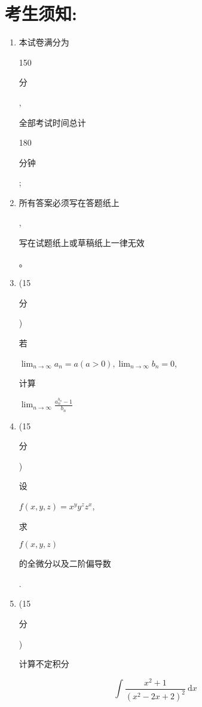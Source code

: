 \documentclass[10pt]{article}
\begin{document}
\section{考生须知:}
\begin{enumerate}
  \item \begin{CJK}{UTF8}{mj}本试卷满分为\end{CJK} 150 \begin{CJK}{UTF8}{mj}分\end{CJK}, \begin{CJK}{UTF8}{mj}全部考试时间总计\end{CJK} 180 \begin{CJK}{UTF8}{mj}分钟\end{CJK};

  \item \begin{CJK}{UTF8}{mj}所有答案必须写在答题纸上\end{CJK}, \begin{CJK}{UTF8}{mj}写在试题纸上或草稿纸上一律无效\end{CJK}。

  \item (15 \begin{CJK}{UTF8}{mj}分\end{CJK}) \begin{CJK}{UTF8}{mj}若\end{CJK} $\lim _{n \rightarrow \infty} a_{n}=a(a>0), \lim _{n \rightarrow \infty} b_{n}=0$, \begin{CJK}{UTF8}{mj}计算\end{CJK} $\lim _{n \rightarrow \infty} \frac{a_{n}^{b_{n}}-1}{b_{n}}$

  \item (15 \begin{CJK}{UTF8}{mj}分\end{CJK}) \begin{CJK}{UTF8}{mj}设\end{CJK} $f(x, y, z)=x^{y} y^{z} z^{x}$, \begin{CJK}{UTF8}{mj}求\end{CJK} $f(x, y, z)$ \begin{CJK}{UTF8}{mj}的全微分以及二阶偏导数\end{CJK}.

  \item (15 \begin{CJK}{UTF8}{mj}分\end{CJK}) \begin{CJK}{UTF8}{mj}计算不定积分\end{CJK}

\end{enumerate}
$$
\int \frac{x^{2}+1}{\left(x^{2}-2 x+2\right)^{2}} \mathrm{~d} x
$$
\end{document}
